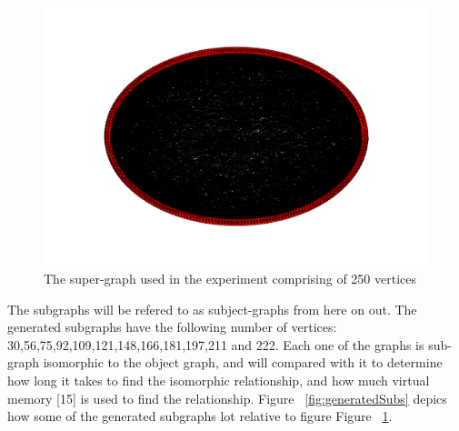 \begin{figure}[H]
  \begin{center}
      \includegraphics[width=1.0\textwidth]{250.png}
  \end{center}    
  \caption{The super-graph used in the experiment comprising of 250 vertices}
  \label{fig:250}
\end{figure} 
The subgraphs will be refered to as subject-graphs from here on out.\newline\newline
The generated subgraphs have the following number of vertices: 30,56,75,92,109,121,148,166,181,197,211 and 222. Each one of the graphs is sub-graph isomorphic to
the object graph, and will compared with it to determine how long it takes to find the isomorphic relationship, and how much virtual memory [15] is used to find 
the relationship.\newline
Figure ~\ref{fig:generatedSubs} depics how some of the generated subgraphs lot relative to figure Figure ~\ref{fig:250}.

